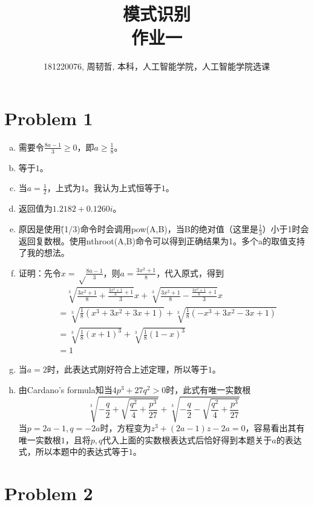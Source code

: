 \documentclass[a4paper,UTF8]{article}
\numberwithin{equation}{section}
\begin{document}
\title{模式识别\\
作业一}
\author{181220076, 周韧哲, 本科，人工智能学院，人工智能学院选课}
\maketitle

\section*{Problem 1}
\begin{enumerate}[(a)]
	\item 需要令$\frac{8a-1}{3}\geq 0$，即$a\geq\frac{1}{8}$。
	\item 等于$1$。
	\item 当$a=\frac{1}{2}$，上式为$1$。我认为上式恒等于$1$。
	\item 返回值为$1.2182 + 0.1260i$。
	\item 原因是使用\^(1/3)命令时会调用pow(A,B)，当B的绝对值（这里是$\frac{1}{3}$）小于1时会返回复数根。使用nthroot(A,B)命令可以得到正确结果为1。多个a的取值支持了我的想法。
	\item 证明：先令$x=\sqrt\frac{8a-1}{3}$，则$a=\frac{3x^2+1}{8}$，代入原式，得到
	      \begin{align*}
	      	&\quad\sqrt[3]{\frac{3x^2+1}{8}+\frac{\frac{3x^2+1}{8}+1}{3}}x+\sqrt[3]{\frac{3x^2+1}{8}-\frac{\frac{3x^2+1}{8}+1}{3}}x\\
	      	&=\sqrt[3]{\frac{1}{8}(x^3+3x^2+3x+1)}+\sqrt[3]{\frac{1}{8}(-x^3+3x^2-3x+1)}\\
	      	&=\sqrt[3]{\frac{1}{8}(x+1)^3}+\sqrt[3]{\frac{1}{8}(1-x)^3}\\
	      	&=1
	      \end{align*}
	\item 当$a=2$时，此表达式刚好符合上述定理，所以等于$1$。
	\item 由Cardano's formula知当$4p^3+27q^2>0$时，此式有唯一实数根
	$$\sqrt[3]{-\frac{q}{2}+\sqrt{\frac{q^2}{4}+\frac{p^3}{27}}} +\sqrt[3]{-\frac{q}{2}-\sqrt{\frac{q^2}{4}+\frac{p^3}{27}}}$$
	当$p=2a-1,q=-2a$时，方程变为$z^3+(2a-1)z-2a=0$，容易看出其有唯一实数根$1$，且将$p,q$代入上面的实数根表达式后恰好得到本题关于$a$的表达式，所以本题中的表达式等于$1$。
	
\end{enumerate}

\section*{Problem 2}
\end{document}
